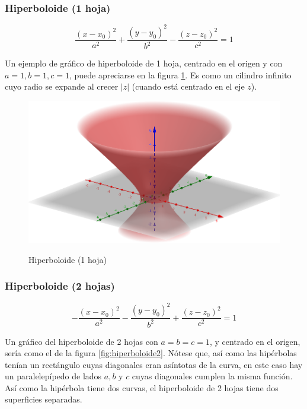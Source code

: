 \documentclass{article}
\begin{document}
\subsubsection{Hiperboloide (1 hoja)}

\begin{equation}
\frac{(x-x_0)^2}{a^2} + \frac{(y-y_0)^2}{b^2} - \frac{(z-z_0)^2}{c^2} = 1
\end{equation}

Un ejemplo de gráfico de hiperboloide de 1 hoja, centrado en el origen y con $a=1, b=1, c=1$, puede apreciarse en la figura \ref{fig:hiperboloide1}. Es como un cilindro infinito cuyo radio se expande al crecer $|z|$ (cuando está centrado en el eje $z$).

\begin{figure}[ht]
\caption{Hiperboloide (1 hoja)}
\includegraphics[scale=0.5]{img/funciones/hiperboloide1.png} 
\centering
\label{fig:hiperboloide1}
\end{figure}

\subsubsection{Hiperboloide (2 hojas)}

\begin{equation}
-\frac{(x-x_0)^2}{a^2} - \frac{(y-y_0)^2}{b^2} + \frac{(z-z_0)^2}{c^2} = 1
\end{equation}

Un gráfico del hiperboloide de 2 hojas con $a = b = c =1$, y centrado en el origen, sería como el de la figura \ref{fig:hiperboloide2}. Nótese que, así como las hipérbolas tenían un rectángulo cuyas diagonales eran asíntotas de la curva, en este caso hay un paralelepípedo de lados $a, b$ y $c$ cuyas diagonales cumplen la misma función. Así como la hipérbola tiene dos curvas, el hiperboloide de 2 hojas tiene dos superficies separadas.
\end{document}
